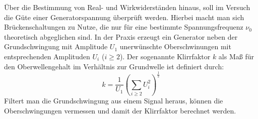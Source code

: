 Über die Bestimmung von Real- und Wirkwiderständen hinaus, soll im Versuch die Güte einer Generatorspannung überprüft werden. Hierbei
macht man sich Brückenschaltungen zu Nutze, die nur für eine bestimmte Spannungsfrequenz $\nu_0$ theoretisch abgeglichen sind. In der
Praxis erzeugt ein Generator neben der Grundschwingung mit Amplitude $U_1$ unerwünschte Oberschwinungen mit entsprechenden
Amplituden $U_i$ ($i\ge 2$). Der sogenannte Klirrfaktor $k$ als Maß für den Oberwellengehalt im Verhältnis zur Grundwelle ist definiert durch:
\begin{equation}
  k = \frac{1}{U_1} \left( \sum_{i\ge2} U_i ^2 \right) ^{\frac{1}{2}}
  \label{eq: klirr}
\end{equation}
Filtert man die Grundschwingung aus einem Signal heraus, können die Oberschwingungen vermessen und damit der Klirrfaktor berechnet werden.
